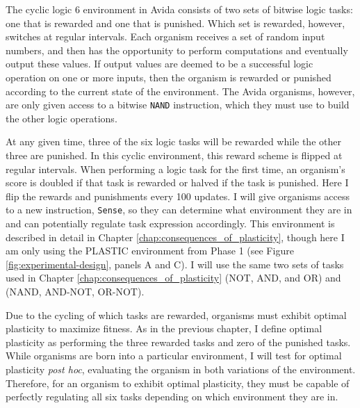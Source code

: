 The cyclic logic 6 environment in Avida consists of two sets of bitwise logic tasks: one that is rewarded and one that is punished. 
Which set is rewarded, however, switches at regular intervals. 
Each organism receives a set of random input numbers, and then has the opportunity to perform computations and eventually output these values.  %
If output values are deemed to be a successful logic operation on one or more inputs, then the organism is rewarded or punished according to the current state of the environment.  
The Avida organisms, however, are only given access to a bitwise \texttt{NAND} instruction, which they must use to build the other logic operations. 

At any given time, three of the six logic tasks will be rewarded while the other three are punished. 
In this cyclic environment, this reward scheme is flipped at regular intervals.
When performing a logic task for the first time, an organism's score is doubled if that task is rewarded or halved if the task is punished. 
Here I flip the rewards and punishments every 100 updates. 
I will give organisms access to a new instruction, \texttt{Sense}, so they can determine what environment they are in and can potentially regulate task expression accordingly.
This environment is described in detail in Chapter \ref{chap:consequences_of_plasticity}, though here I am only using the PLASTIC environment from Phase 1 (see Figure \ref{fig:experimental-design}, panels A and C). 
I will use the same two sets of tasks used in Chapter \ref{chap:consequences_of_plasticity} (NOT, AND, and OR) and (NAND, AND-NOT, OR-NOT).

Due to the cycling of which tasks are rewarded, organisms must exhibit optimal plasticity to maximize fitness. 
As in the previous chapter, I define optimal plasticity as performing the three rewarded tasks and zero of the punished tasks. 
While organisms are born into a particular environment, I will test for optimal plasticity \textit{post hoc}, evaluating the organism in both variations of the environment. 
Therefore, for an organism to exhibit optimal plasticity, they must be capable of perfectly regulating all six tasks depending on which environment they are in. 

